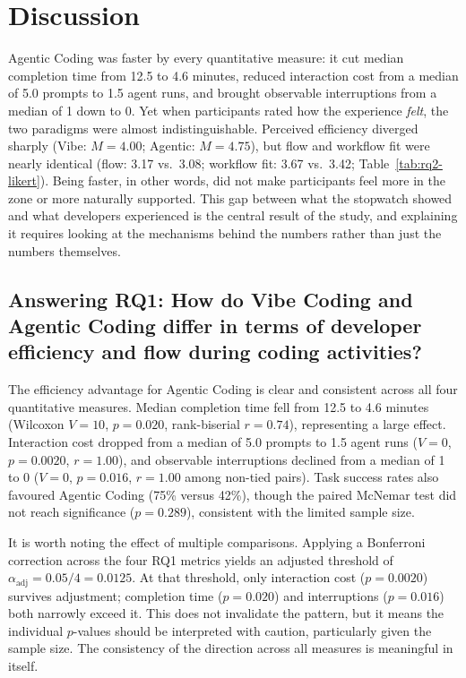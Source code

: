 \chapter{Discussion}

\label{chap:discussion}

Agentic Coding was faster by every quantitative measure: it cut median completion time from 12.5 to 4.6 minutes, reduced interaction cost from a median of 5.0 prompts to 1.5 agent runs, and brought observable interruptions from a median of 1 down to 0. Yet when participants rated how the experience \emph{felt}, the two paradigms were almost indistinguishable. Perceived efficiency diverged sharply (Vibe: $M=4.00$; Agentic: $M=4.75$), but flow and workflow fit were nearly identical (flow: 3.17 vs.\ 3.08; workflow fit: 3.67 vs.\ 3.42; Table~\ref{tab:rq2-likert}). Being faster, in other words, did not make participants feel more in the zone or more naturally supported. This gap between what the stopwatch showed and what developers experienced is the central result of the study, and explaining it requires looking at the mechanisms behind the numbers rather than just the numbers themselves.


\section{Answering RQ1: How do Vibe Coding and Agentic Coding differ in terms of developer efficiency and flow during coding activities?}

\label{sec:disc-rq1}

The efficiency advantage for Agentic Coding is clear and consistent across all four quantitative measures. Median completion time fell from 12.5 to 4.6 minutes (Wilcoxon $V=10$, $p=0.020$, rank-biserial $r=0.74$), representing a large effect. Interaction cost dropped from a median of 5.0 prompts to 1.5 agent runs ($V=0$, $p=0.0020$, $r=1.00$), and observable interruptions declined from a median of 1 to 0 ($V=0$, $p=0.016$, $r=1.00$ among non-tied pairs). Task success rates also favoured Agentic Coding (75\% versus 42\%), though the paired McNemar test did not reach significance ($p=0.289$), consistent with the limited sample size.

It is worth noting the effect of multiple comparisons. Applying a Bonferroni correction across the four RQ1 metrics yields an adjusted threshold of $\alpha_{\text{adj}} = 0.05/4 = 0.0125$. At that threshold, only interaction cost ($p=0.0020$) survives adjustment; completion time ($p=0.020$) and interruptions ($p=0.016$) both narrowly exceed it. This does not invalidate the pattern, but it means the individual $p$-values should be interpreted with caution, particularly given the sample size. The consistency of the direction across all measures is meaningful in itself.

